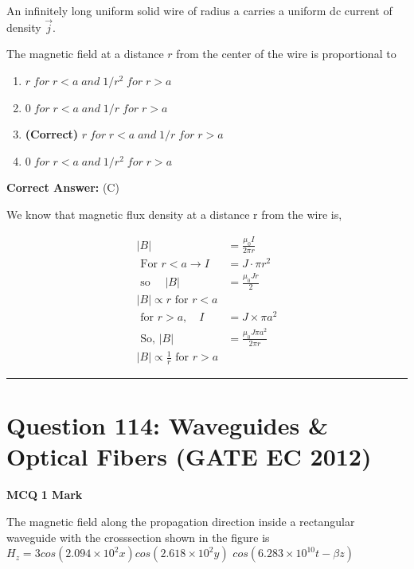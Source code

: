 \documentclass[11pt,a4paper]{article}
\begin{document}
\noindent An infinitely long uniform solid wire of radius a carries a uniform dc current of density $\overrightarrow{j}$. 

The magnetic field at a distance $r$  from the center of the wire is proportional to


\begin{enumerate}[label=(\Alph*)]
    \item $r \; for \; r < a \; and \; 1/r^{2}\; for \;r > a$
    \item $0 \; for \; r  <  a \; and \; 1 /r \; for \; r  >  a$
    \item \textbf{(Correct)} $r \; for \; r  <  a \; and \; 1 /r \; for \; r  >  a$
    \item $0 \; for\; r < a \; and \; 1/r^{2} \;for \; r > a$
\end{enumerate}

\noindent \textbf{Correct Answer:} (C)

\begin{tcolorbox}[solbox, title=Detailed Solution -- Question 113]
We know that magnetic flux density at a distance r from the wire is, 

\[
\begin{aligned} |B| &=\frac{\mu_{0} I}{2 \pi r} \\ \text { For } r < a \rightarrow I&=J \cdot \pi r^{2} \\ \text { so } \quad |B|&=\frac{\mu_{0} J r}{2}\\ |B| \propto r \text { for } r < a \\ \text { for } r > a,\quad I&=J \times \pi a^{2} \\ \text { So, } |B|&=\frac{\mu_{0} J \pi a^{2}}{2 \pi r} \\ |B| \propto \frac{1}{r} \text { for } r > a \end{aligned}
\]
\end{tcolorbox}

\vspace{1.5em}
\hrule
\vspace{1.5em}

\section*{Question 114: Waveguides \& Optical Fibers (GATE EC 2012)}
\noindent \textbf{\color{primary}MCQ} \hfill \textbf{\color{secondary}1 Mark}


\noindent The magnetic field along the propagation direction inside a rectangular waveguide with the crosssection shown in the figure is $H_{z}=3 cos(2.094 \times  10^{2}x)cos(2.618 \times 10^{2}y)$ $cos(6.283 \times 10^{10}t-\beta z)$
\end{document}
